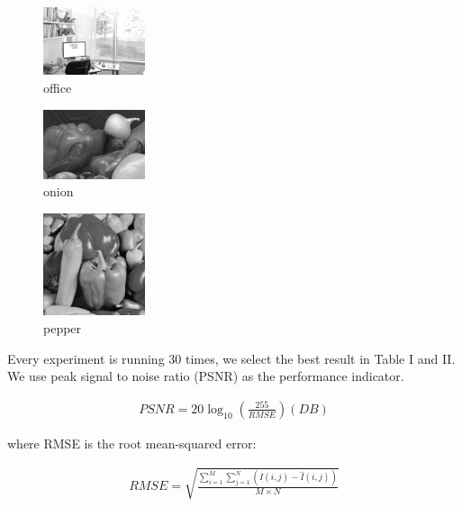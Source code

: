 \documentclass[conference]{IEEEtran}
\begin{document}
\begin{figure}[H]
    \centerline{\includegraphics[width=3cm]{picture/office.png}}
    \caption{office}
    \label{office}
\end{figure}

\begin{figure}[H]
    \centerline{\includegraphics[width=3cm]{picture/onion.png}}
    \caption{onion}
    \label{onion}
\end{figure}

\begin{figure}[H]
    \centerline{\includegraphics[width=3cm]{picture/pepper.png}}
    \caption{pepper}
    \label{pepper}
\end{figure}

Every experiment is running 30 times, we select the best result in Table I and II. We use peak signal to noise ratio (PSNR) as the performance indicator.

\begin{equation}
    \begin{aligned}
    \label{PSNR}
    PSNR=20\log_{10}(\frac{255}{RMSE}) (DB)       
\end{aligned}
\end{equation}

where RMSE is the root mean-squared error:

\begin{equation}
    \begin{aligned}
    \label{PSNR}
    RMSE=\sqrt{\frac{\sum\limits_{i=1}^{M}\sum\limits_{j=1}^{N}(I(i,j)-\hat{I}(i,j))}{M\times N}}    
\end{aligned}
\end{equation}
\end{document}

